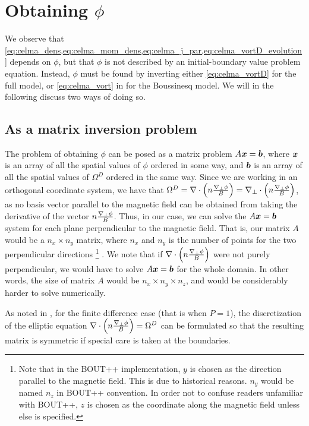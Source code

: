 \section{Obtaining \texorpdfstring{$\phi$}{the potential}}
%
We observe that \cref{eq:celma_dens,eq:celma_mom_dens,eq:celma_j_par,eq:celma_vortD_evolution} depends on $\phi$, but that $\phi$ is not described by an initial-boundary value problem equation.
Instead, $\phi$ must be found by inverting either \cref{eq:celma_vortD} for the full model, or \cref{eq:celma_vort} in for the Boussinesq model.
We will in the following discuss two ways of doing so.

\subsection{As a matrix inversion problem}
%
The problem of obtaining $\phi$ can be posed as a matrix problem $A\boldsymbol{x}=\boldsymbol{b}$, where $\boldsymbol{x}$ is an array of all the spatial values of $\phi$ ordered in some way, and $\boldsymbol{b}$ is an array of all the spatial values of $\Omega^D$ ordered in the same way.
Since we are working in an orthogonal coordinate system, we have that $\Omega^D = \nabla\cdot\left(n\frac{\nabla_\perp\phi}{B}\right) = \nabla_\perp\cdot\left(n\frac{\nabla_\perp\phi}{B}\right)$, as no basis vector parallel to the magnetic field can be obtained from taking the derivative of the vector $n\frac{\nabla_\perp\phi}{B}$.
Thus, in our case, we can solve the $A\boldsymbol{x}=\boldsymbol{b}$ system for each plane perpendicular to the magnetic field.
That is, our matrix $A$ would be a $n_x \times n_y$ matrix, where $n_x$ and $n_y$ is the number of points for the two perpendicular directions
%
\footnote{
Note that in the BOUT++ implementation, $y$ is chosen as the direction parallel to the magnetic field.
This is due to historical reasons.
$n_y$ would be named $n_z$ in BOUT++ convention.
In order not to confuse readers unfamiliar with BOUT++, $z$ is chosen as the coordinate along the magnetic field unless else is specified.
}%
%
.
We note that if $\nabla\cdot\left(n\frac{\nabla_\perp\phi}{B}\right)$ were not purely perpendicular, we would have to solve $A\boldsymbol{x}=\boldsymbol{b}$ for the whole domain.
In other words, the size of matrix $A$ would be $n_x \times n_y \times n_z$, and would be considerably harder to solve numerically.

As noted in \cite{Wiesenberger2014Phd}, for the finite difference case (that is when $P=1$), the discretization of the elliptic equation $\nabla\cdot\left(n\frac{\nabla_\perp\phi}{B}\right)=\Omega^D$ can be formulated so that the resulting matrix is symmetric if special care is taken at the boundaries.

